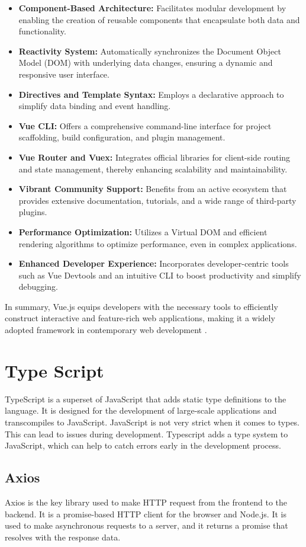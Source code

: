 \begin{itemize}
    \item \textbf{Component-Based Architecture:} Facilitates modular development by enabling the creation of reusable components that encapsulate both data and functionality.
    \item \textbf{Reactivity System:} Automatically synchronizes the Document Object Model (DOM) with underlying data changes, ensuring a dynamic and responsive user interface.
    \item \textbf{Directives and Template Syntax:} Employs a declarative approach to simplify data binding and event handling.
    \item \textbf{Vue CLI:} Offers a comprehensive command-line interface for project scaffolding, build configuration, and plugin management.
    \item \textbf{Vue Router and Vuex:} Integrates official libraries for client-side routing and state management, thereby enhancing scalability and maintainability.
    \item \textbf{Vibrant Community Support:} Benefits from an active ecosystem that provides extensive documentation, tutorials, and a wide range of third-party plugins.
    \item \textbf{Performance Optimization:} Utilizes a Virtual DOM and efficient rendering algorithms to optimize performance, even in complex applications.
    \item \textbf{Enhanced Developer Experience:} Incorporates developer-centric tools such as Vue Devtools and an intuitive CLI to boost productivity and simplify debugging.
\end{itemize}

In summary, Vue.js equips developers with the necessary tools to efficiently construct interactive and feature-rich web applications, making it a widely adopted framework in contemporary web development 
\cite{VueJS-introduction}.

\section{Type Script}
TypeScript is a superset of JavaScript that adds static type definitions to the language. It is designed for the development of large-scale applications and transcompiles to JavaScript.
JavaScript is not very strict when it comes to types. This can lead to issues during development. Typescript adds a type system to JavaScript, which can help to catch errors early in the development process. 
\cite{Typescript_w3}

\subsection{Axios}
Axios is the key library used to make HTTP request from the frontend to the backend. It is a promise-based HTTP client for the browser and Node.js. It is used to make asynchronous requests to a server, and it returns a promise that resolves with the response data. 
\cite{axios_docs}

